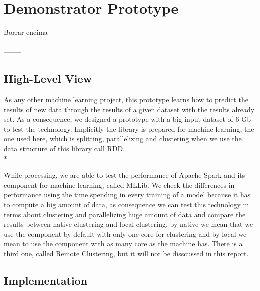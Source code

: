 \section{Demonstrator Prototype}
\label{sec:prototype}
  


Borrar encima --------------------------------------------------------------------------------------------------------------------



\subsection{High-Level View}
As any other machine learning project, this prototype learns how to predict the results of new data through the results of a given dataset with the results already set. As a consequence, we designed a prototype with a big input dataset of 6 Gb to test the technology. Implicitly the library is prepared for machine learning, the one used here, which is splitting, parallelizing and clustering when we use the data structure of this library call RDD.\\*

While processing, we are able to test the performance of Apache Spark and its component for machine learning, called MLLib. 
We check the differences in performance using the time spending in every training of a model because it has to compute a big amount of data, as consequence we can test this technology in terms about clustering and parallelizing huge amount of data and compare the results between native clustering and local clustering, by native we mean that we use the component by default with only one core for clustering and by local we mean to use the component with as many core as the machine has. There is a third one, called Remote Clustering, but it will not be disscussed in this report.
\subsection{Implementation}